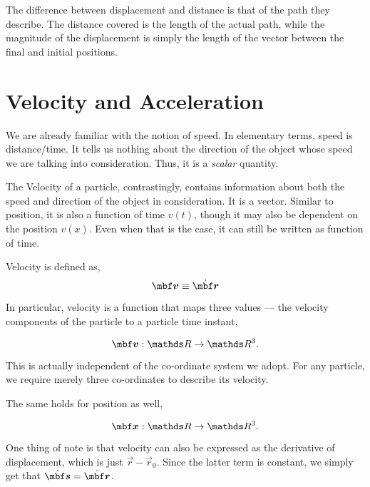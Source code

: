 The difference between displacement and distance is that of the path they describe. The distance covered is the length
of the actual path, while the magnitude of the displacement is simply the length of the vector between the final and initial positions.

\section{Velocity and Acceleration}


We are already familiar with the notion of speed. In elementary terms, speed is {distance}/{time}.
It tells us nothing about the direction of the object whose speed we are
talking into consideration. Thus, it is a \emph{scalar} quantity.

\parbreak
{}


The Velocity of a particle, contrastingly, contains information about both the speed and direction of the
object in consideration. 
It is a vector. Similar to position, it is also a function of time \(v(t)\), though it
may also be dependent on the position \(v(x)\). Even when that is the case,
it can still be written as function of time.

\begin{definition}
    [Velocity]
    \label{def: velocity}
    Velocity is defined as,
    \begin{equation}
        \vec{v} \equiv \ndiv{\vec{r}}    
    \end{equation}
\end{definition}

In particular, velocity is a function that maps three values --- the velocity components 
of the particle to a particle time instant, 

\[
    \vv : \RR \to \RR^3.
\] 

This is actually independent of the co-ordinate system we adopt. For any 
particle, we require merely three co-ordinates to describe its velocity. 

The same holds for position as well,

\[
    \vec{x} : \RR \to \RR^3.
\]

One thing of note is that velocity can also be expressed as the derivative of 
displacement, which is just \(\vec{r} - \vec{r}_0\). Since the latter 
term is constant, we simply get that \(\ndiv{\vec{s}} = \ndiv{\vec{r}}\).

